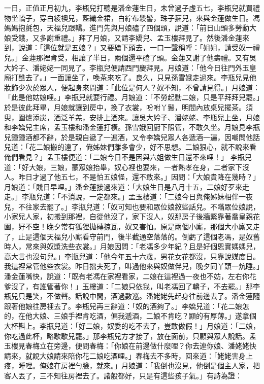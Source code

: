 一日，正值正月初九，李瓶兒打聽是潘金蓮生日，未曾過子虛五七，李瓶兒就買禮物坐轎子，穿白綾襖兒，藍織金裙，白紵布鬏髻，珠子箍兒，來與金蓮做生日。馮媽媽抱氈包，天福兒跟轎。進門先與月娘磕了四個頭，說道：「前日山頭多勞動大娘受餓，又多謝重禮。」拜了月娘，又請李嬌兒、孟玉樓拜見了。然後潘金蓮來到，說道：「這位就是五娘？」又要磕下頭去，一口一聲稱呼：「姐姐，請受奴一禮兒。」金蓮那裡肯受，相讓了半日，兩個還平磕了頭。金蓮又謝了他壽禮。又有吳大妗子、潘姥姥一同見了。李瓶兒便請西門慶拜見。月娘道：「他今日往門外玉皇廟打醮去了。」一面讓坐了，喚茶來吃了。良久，只見孫雪娥走過來。李瓶兒見他妝飾少次於眾人，便起身來問道：「此位是何人？奴不知，不曾請見得。」月娘道：「此是他姑娘哩。」李瓶兒就要行禮。月娘道：「不勞起動二娘，只是平拜拜兒罷。」於是彼此拜畢，月娘就讓到房中，換了衣裳，吩咐丫鬟，明間內放桌兒擺茶。須臾，圍爐添炭，酒泛羊羔，安排上酒來。讓吳大妗子、潘姥姥、李瓶兒上坐，月娘和李嬌兒主席，孟玉樓和潘金蓮打橫。孫雪娥回廚下照管，不敢久坐。月娘見李瓶兒鍾鍾酒都不辭，於是親自遞了一遍酒，又令李嬌兒眾人各遞酒一遍，因嘲問他話兒道：「花二娘搬的遠了，俺姊妹們離多會少，好不思想。二娘狠心，就不說來看俺們看見？」孟玉樓便道：「二娘今日不是因與六姐做生日還不來哩！」 李瓶兒道：「好大娘，三娘，蒙眾娘抬舉，奴心裡也要來，一者熱孝在身，二者家下沒人。昨日才過了他五七，不是怕五娘怪，還不敢來。」因問：「大娘貴降在幾時？」月娘道：「賤日早哩。」潘金蓮接過來道：「大娘生日是八月十五，二娘好歹來走走。」李瓶兒道：「不消說，一定都來。」孟玉樓道：「二娘今日與俺姊妹相伴一夜兒，不往家去罷了。」李瓶兒道：「奴可知也要和眾位娘敘些話兒。不瞞眾位娘說，小家兒人家，初搬到那裡，自從他沒了，家下沒人，奴那房子後牆緊靠著喬皇親花園，好不空！晚夕常有狐狸拋磚掠瓦，奴又害怕。原是兩個小廝，那個大小廝又走了，止是這個天福兒小廝看守前門，後半截通空落落的。倒虧了這個老馮，是奴舊時人，常來與奴漿洗些衣裳。」月娘因問：「老馮多少年紀？且是好個恩實媽媽兒，高大言也沒句兒。」李瓶兒道：「他今年五十六歲，男花女花都沒，只靠說媒度日。我這裡常管他些衣裳。昨日拙夫死了，叫過他來與奴做伴兒，晚夕同丫頭一炕睡。」潘金蓮嘴快，說道：「既有老馮在家裡看家，二娘在這裡過一夜也不妨，左右你花爹沒了，有誰管著你！」玉樓道：「二娘只依我，叫老馮回了轎子，不去罷。」那李瓶兒只是笑，不做聲。話說中間，酒過數巡。潘姥姥先起身往前邊去了。潘金蓮隨跟著他娘往房裡去了。李瓶兒再三辭道：「奴的酒夠了。」李嬌兒道：「花二娘怎的，在他大娘、三娘手裡肯吃酒，偏我遞酒，二娘不肯吃？顯的有厚薄。」遂拿個大杯斟上。李瓶兒道：「好二娘，奴委的吃不去了，豈敢做假！」月娘道：「二娘，你吃過此杯，略歇歇兒罷。」那李瓶兒方才接了，放在面前，只顧與眾人說話。孟玉樓見春梅立在旁邊，便問春梅：「你娘在前邊做什麼哩？你去連你娘、潘姥姥快請來，就說大娘請來陪你花二娘吃酒哩。」春梅去不多時，回來道：「姥姥害身上疼，睡哩。俺娘在房裡勻臉，就來。」月娘道：「我倒也沒見，他倒是個主人家，把客人丟了，三不知往房裡去了。諸般都好，只是有這些孩子氣。」有詩為證：

